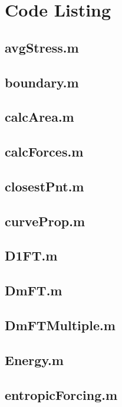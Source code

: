 \section{Code Listing}
\subsection{avgStress.m}

\subsection{boundary.m}

\subsection{calcArea.m}

\subsection{calcForces.m}

\subsection{closestPnt.m}

\subsection{curveProp.m}

\subsection{D1FT.m}

\subsection{DmFT.m}

\subsection{DmFTMultiple.m}

\subsection{Energy.m}

\subsection{entropicForcing.m}

